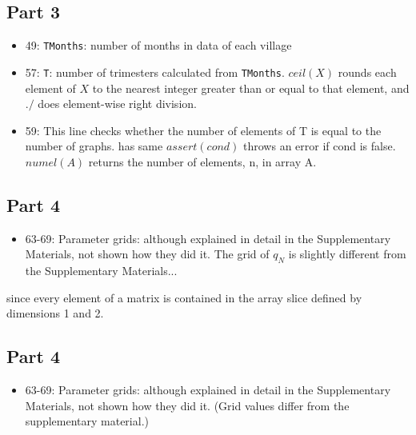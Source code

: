 \documentclass[10pt,letterpaper]{article}
\begin{document}
\subsection*{Part 3}
\begin{itemize}
  \item 49: \texttt{TMonths}: number of months in data of each village
  \item 57: \texttt{T}: number of trimesters calculated from \texttt{TMonths}. $ceil(X)$ rounds each element of $X$ to the nearest integer greater than or equal to that element, and $./$ does element-wise right division.
  \item 59: This line checks whether the number of elements of T is equal to the number of graphs. has same $assert(cond)$ throws an error if cond is false. $numel(A)$ returns the number of elements, n, in array A.
\end{itemize}

\subsection*{Part 4}
\begin{itemize}
  \item 63-69: Parameter grids: although explained in detail in the Supplementary Materials, not shown how they did it. The grid of $q_N$ is slightly different from the Supplementary Materials...
\end{itemize} since every element of a matrix is contained in the array slice defined by dimensions 1 and 2.

\subsection*{Part 4}
\begin{itemize}
  \item 63-69: Parameter grids: although explained in detail in the Supplementary Materials, not shown how they did it. (Grid values differ from the supplementary material.)
\end{itemize}
\end{document}
